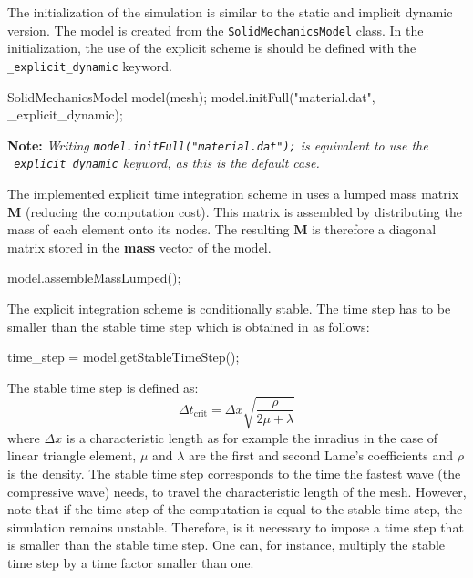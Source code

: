 \documentclass[a4paper,11pt]{book}
\newcommand{\akantu}{{\cminfamily{\textbf{Akantu}}}\xspace}
\newcommand{\code}[1]{\texttt{#1}}
\newcommand{\note}[1]{\textbf{Note: }\textit{#1}}
\newcommand{\mat}[1]{\ensuremath{\boldsymbol{#1}}}
\newcommand{\st}[1]{{\mathrm{#1}}}
\begin{document}
The  initialization of  the simulation  is similar  to the  static  and implicit
dynamic  version.   The model  is  created  from the  \code{SolidMechanicsModel}
class.   In the  initialization, the  use of  the explicit  scheme is  should be
defined with the \code{\_explicit\_dynamic} keyword.

\begin{cpp}
  SolidMechanicsModel model(mesh);
  model.initFull("material.dat", _explicit_dynamic);
\end{cpp}

\note{Writing \code{model.initFull("material.dat");}  is equivalent to  use the
  \code{\_explicit\_dynamic} keyword, as this is the default case.}

The implemented explicit  time integration scheme in \akantu  uses a lumped mass
matrix $\mat{M}$  (reducing the computation  cost). This matrix is  assembled by
distributing the mass of each element onto its nodes. The resulting $\mat{M}$ is
therefore a diagonal matrix stored in the \textbf{mass} vector of the model.


\begin{cpp}
  model.assembleMassLumped();
\end{cpp}

The explicit integration scheme is conditionally stable. The time step has to be
smaller than the stable time step which is obtained in \akantu as follows:

\begin{cpp}
  time_step = model.getStableTimeStep();
\end{cpp}

The stable time step is defined as:
\begin{equation}
  \Delta t_{\st{crit}} = \Delta x \sqrt{\frac{\rho}{2 \mu +\lambda}}
\end{equation}\label{eqn:smm:explicit:stabletime}
where $\Delta x$  is a characteristic length as for example  the inradius in the
case of  linear triangle element, $\mu$  and $\lambda$ are the  first and second
Lame's coefficients and $\rho$ is the density.  The stable time step corresponds
to  the time  the  fastest wave  (the  compressive wave)  needs,  to travel  the
characteristic length of  the mesh.  However, note that if the  time step of the
computation  is  equal   to  the  stable  time  step,   the  simulation  remains
unstable. Therefore, is it necessary to  impose a time step that is smaller than
the stable time step. One can, for  instance, multiply the stable time step by a
time factor smaller than one.
\end{document}
